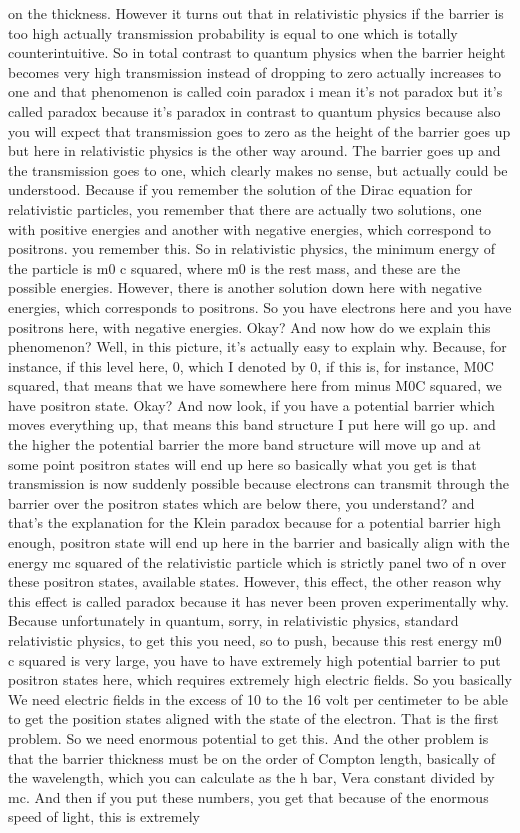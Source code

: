 on the thickness. However it turns out that in relativistic physics if the barrier is too high actually transmission probability is equal to one which is totally counterintuitive. So in total contrast to quantum physics when the barrier height becomes very high transmission instead of dropping to zero actually increases to one and that phenomenon is called coin paradox i mean it's not paradox but it's called paradox because it's paradox in contrast to quantum physics because also you will expect that transmission goes to zero as the height of the barrier goes up but here in relativistic physics is the other way around. The barrier goes up and the transmission goes to one, which clearly makes no sense, but actually could be understood. Because if you remember the solution of the Dirac equation for relativistic particles, you remember that there are actually two solutions, one with positive energies and another with negative energies, which correspond to positrons. you remember this. So in relativistic physics, the minimum energy of the particle is m0 c squared, where m0 is the rest mass, and these are the possible energies. However, there is another solution down here with negative energies, which corresponds to positrons. So you have electrons here and you have positrons here, with negative energies. Okay? And now how do we explain this phenomenon? Well, in this picture, it's actually easy to explain why. Because, for instance, if this level here, 0, which I denoted by 0, if this is, for instance, M0C squared, that means that we have somewhere here from minus M0C squared, we have positron state. Okay? And now look, if you have a potential barrier which moves everything up, that means this band structure I put here will go up. and the higher the potential barrier the more band structure will move up and at some point positron states will end up here so basically what you get is that transmission is now suddenly possible because electrons can transmit through the barrier over the positron states which are below there, you understand? and that's the explanation for the Klein paradox because for a potential barrier high enough, positron state will end up here in the barrier and basically align with the energy mc squared of the relativistic particle which is strictly panel two of n over these positron states, available states. However, this effect, the other reason why this effect is called paradox because it has never been proven experimentally why. Because unfortunately in quantum, sorry, in relativistic physics, standard relativistic physics, to get this you need, so to push, because this rest energy m0 c squared is very large, you have to have extremely high potential barrier to put positron states here, which requires extremely high electric fields. So you basically We need electric fields in the excess of 10 to the 16 volt per centimeter to be able to get the position states aligned with the state of the electron. That is the first problem. So we need enormous potential to get this. And the other problem is that the barrier thickness must be on the order of Compton length, basically of the wavelength, which you can calculate as the h bar, Vera constant divided by mc. And then if you put these numbers, you get that because of the enormous speed of light, this is extremely 